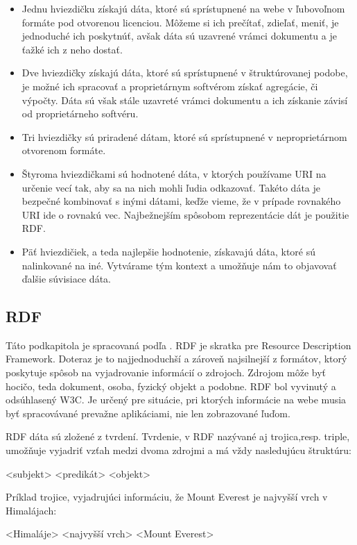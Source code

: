 \begin{itemize}
\item Jednu hviezdičku získajú dáta, ktoré sú sprístupnené na webe v ľubovoľnom formáte pod otvorenou licenciou. Môžeme si ich prečítať, zdieľať, meniť, je jednoduché ich poskytnúť, avšak dáta sú uzavrené vrámci dokumentu a je ťažké ich z neho dostať.
\item Dve hviezdičky získajú dáta, ktoré sú sprístupnené v štruktúrovanej podobe, je možné ich spracovať a proprietárnym softvérom získať agregácie, či výpočty. Dáta sú však stále uzavreté vrámci dokumentu a ich získanie závisí od proprietárneho softvéru.
\item Tri hviezdičky sú priradené dátam, ktoré sú sprístupnené v neproprietárnom otvorenom formáte.
\item Štyroma hviezdičkami sú hodnotené dáta, v ktorých používame URI na určenie vecí tak, aby sa na nich mohli ľudia odkazovať. Takéto dáta je bezpečné kombinovať s inými dátami, keďže vieme, že v prípade rovnakého URI ide o rovnakú vec. Najbežnejším spôsobom reprezentácie dát je použitie RDF.
\item Päť hviezdičiek, a teda najlepšie hodnotenie, získavajú dáta, ktoré sú nalinkované na iné. Vytvárame tým kontext a umožňuje nám to objavovať ďalšie súvisiace dáta.
\end{itemize}

\subsection{RDF} \label{secRdf}
Táto podkapitola je spracovaná podľa \cite{rdf, rdf2}. RDF je skratka pre Resource Description
Framework. Doteraz je to najjednoduchší a zároveň najsilnejší z formátov, ktorý poskytuje spôsob na vyjadrovanie informácií o zdrojoch. Zdrojom môže byť hocičo, teda dokument, osoba, fyzický objekt a podobne. RDF bol vyvinutý a odsúhlasený W3C. Je určený pre situácie, pri ktorých informácie na
webe musia byť spracovávané prevažne aplikáciami, nie len zobrazované ľuďom.

RDF dáta sú zložené z tvrdení. Tvrdenie, v RDF nazývané aj trojica,resp. triple, umožňuje vyjadriť vzťah medzi dvoma zdrojmi a má vždy nasledujúcu štruktúru:

\begin{center}
<subjekt> <predikát> <objekt>
\end{center}
Príklad trojice, vyjadrujúci informáciu, že Mount Everest je najvyšší vrch v Himalájach:
\begin{center}
<Himaláje> <najvyšší vrch> <Mount Everest>
\end{center}


